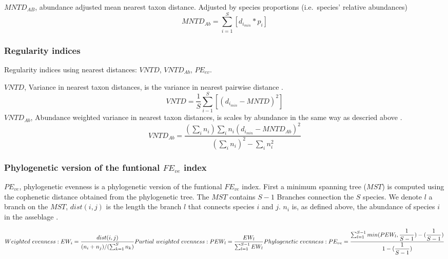 \documentclass[]{book}
\theoremstyle{definition}
\theoremstyle{definition}
\theoremstyle{remark}
\begin{document}
\(MNTD_{AB}\), abundance adjusted mean nearest taxon distance. Adjusted
by species proportions (i.e.~species' relative abundances)
\citep{Webb2002, Webb2008, Kembel2010}\\
\[
MNTD_{Ab} = 
\sum_{i=1}^{S}
[d_{i_{min}} * p_{i}]
\]

\subsubsection{Regularity indices}\label{regularity-indices}

Regularity indices using nearest distances: \(VNTD\), \(VNTD_{Ab}\),
\(PE_{ev}\).

\(VNTD\), Variance in nearest taxon distances, is the variance in
nearest pairwise distance \citep{Tucker2016}. \[
VNTD = \dfrac{1}{S}
\sum_{i-1}^{S}
[(d_{i_{min}} - MNTD)^2]
\] \(VNTD_{Ab}\), Abundance weighted variance in nearest taxon
distances, is scales by abundance in the same way as descried above
\citep{Tucker2016}. \[
VNTD_{Ab} = \dfrac
{(\sum_{i} n_{i}) \sum_{i} n_{i} (d_{i_{min}} - MNTD_{Ab})^2}
{(\sum_{i} n_{i})^2 - \sum_{i} n_{i} ^2}
\]

\subsubsection{\texorpdfstring{Phylogenetic version of the funtional
\(FE_{ve}\)
index}{Phylogenetic version of the funtional FE\_\{ve\} index}}\label{phylogenetic-version-of-the-funtional-fe_ve-index}

\(PE_{ve}\), phylogenetic evenness is a phylogenetic version of the
funtional \(FE_{ve}\) index. First a minimum spanning tree (\(MST\)) is
computed using the cophenetic distance obtained from the phylogenetic
tree. The \(MST\) contains \(S-1\) Branches connection the \(S\)
species. We denote \(l\) a branch on the \(MST\), \(dist(i,j)\) is the
length the branch \(l\) that connects species \(i\) and \(j\). \(n_{i}\)
is, as defined above, the abundance of species \(i\) in the asseblage
\citep{Villeger2008, Dehling2014}.

\[
Weighted \ evenness: \\
EW_{i} = \dfrac{dist(i,j)}
{(n_{i} + n_{j})/(\sum_{k=1}^{S}n_{k})} \\
\ \\
Partial \ weighted \ evenness: \\ 
PEW_{l} = \dfrac
{EW_{l}}
{\sum_{l=1}^{S-1} EW_{l}} \\
\ \\
Phylogenetic \ evenness: \\
PE_{ve} = \dfrac
{\sum_{l=1}^{S-1} min(PEW_{l}, \dfrac{1}{S-1}) - (\dfrac{1}{S-1})}
{1- (\dfrac{1}{S-1})}
\]
\end{document}
